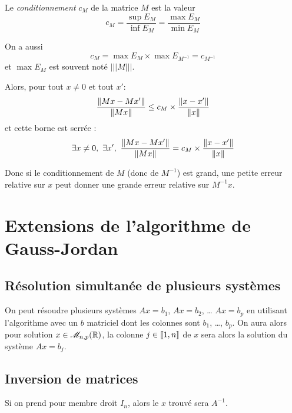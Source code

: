 Le \emph{conditionnement} $c_{M}$ de la matrice $M$ est la valeur
\begin{equation*}
  c_{M} = \frac{\sup E_{M}}{\inf E_{M}} = \frac{\max E_{M}}{\min E_{M}}
\end{equation*}
\begin{rem}
On a aussi
\begin{equation*}
  c_{M} = \max E_{M}\times \max E_{M^{-1}} = c_{M^{-1}}
\end{equation*}
et $\max E_{M}$ est souvent noté $\lvert\lvert\lvert M \rvert\rvert\rvert$.
\end{rem}
Alors, pour tout $x\neq 0$ et tout $x'$:
\begin{equation*}
  \frac{\left\Vert {Mx-Mx'}\right\Vert}{\left\Vert {Mx}\right\Vert} \leq c_{M}\times \frac{\left\Vert {x-x'}\right\Vert}{\left\Vert {x}\right\Vert}
\end{equation*}
et cette borne est serrée :
\begin{equation*}
  \exists x\neq 0,~  \exists x' ,~
  \frac{\left\Vert {Mx-Mx'}\right\Vert}{\left\Vert {Mx}\right\Vert} = c_{M}\times \frac{\left\Vert {x-x'}\right\Vert}{\left\Vert {x}\right\Vert}
\end{equation*}

Donc si le conditionnement de $M$ (donc de $M^{-1}$) est grand, une
petite erreur relative sur $x$ peut donner une grande erreur relative
sur $M^{-1}x$.

\section{Extensions de l'algorithme de Gauss-Jordan}

\subsection{Résolution simultanée de plusieurs systèmes}

On peut résoudre plusieurs systèmes $Ax = b_{1}$, $Ax=b_{2}$,
  \ldots{} $Ax = b_{p}$ en utilisant l'algorithme avec un $b$ matriciel
  dont les colonnes sont $b_{1}$, \ldots{}, $b_{p}$. 
  On aura alors pour solution $x\in \mathscr{M}_{n,p}(\mathbb{R})$, la colonne $j\in[\![1,n]\!]$ de $x$ sera alors la solution du système $Ax = b_j$.
  
\subsection{Inversion de matrices}  
Si on prend pour membre droit $I_{n}$, alors le $x$ trouvé sera $A^{-1}$.

